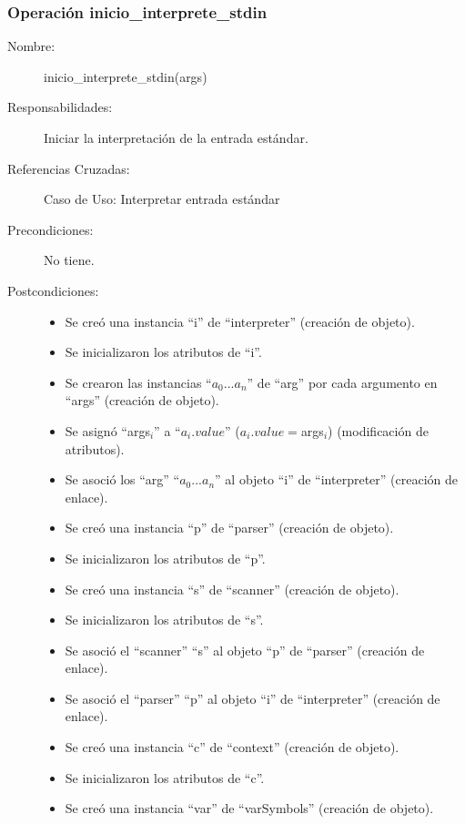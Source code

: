 \subsubsection{Operación inicio\_interprete\_stdin}
\FloatBarrier
\begin{framed}
	\begin{description}
		\item [Nombre:] inicio\_interprete\_stdin(args)
		\item [Responsabilidades:] Iniciar la interpretación de la entrada estándar.
		\item [Referencias Cruzadas: ] Caso de Uso: Interpretar entrada estándar
      \item [Precondiciones:] No tiene.
      \item [Postcondiciones:] \hfill
      \begin {itemize}
         \item Se creó una instancia ``i'' de ``interpreter'' (creación de objeto).
         \item Se inicializaron los atributos de ``i''.
         \item Se crearon las instancias ``$a_0...a_n$'' de ``arg'' por cada argumento en ``args'' (creación de objeto).
         \item Se asignó ``args$_i$'' a ``$a_i.value$'' ($a_i.value = $args$_i$) (modificación de atributos).
         \item Se asoció los ``arg'' ``$a_0...a_n$'' al objeto ``i'' de ``interpreter'' (creación de enlace).
         \item Se creó una instancia ``p'' de ``parser'' (creación de objeto).
         \item Se inicializaron los atributos de ``p''.
         \item Se creó una instancia ``s'' de ``scanner'' (creación de objeto).
         \item Se inicializaron los atributos de ``s''.
         \item Se asoció el ``scanner'' ``s'' al objeto ``p'' de ``parser'' (creación de enlace).
         \item Se asoció el ``parser'' ``p'' al objeto ``i'' de ``interpreter'' (creación de enlace).
         \item Se creó una instancia ``c'' de ``context'' (creación de objeto).
         \item Se inicializaron los atributos de ``c''.
         \item Se creó una instancia ``var'' de ``varSymbols'' (creación de objeto).

\end{itemize}
\end{description}
\end{framed}
